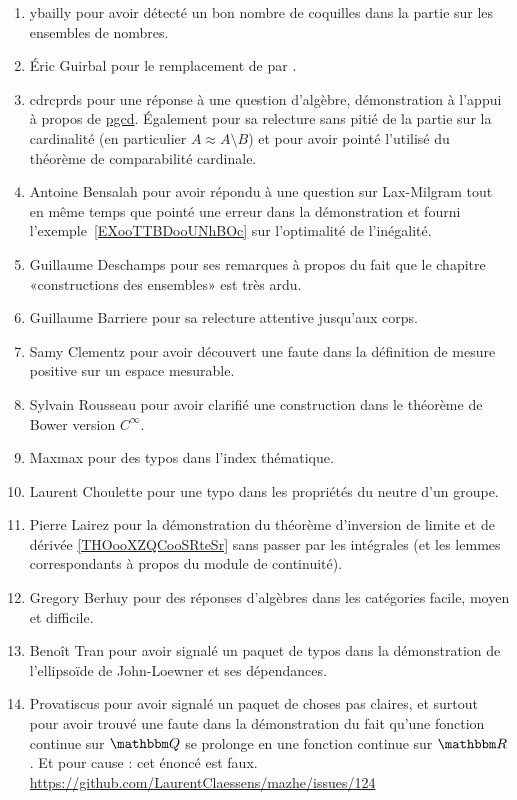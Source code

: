 \begin{enumerate}
    \item
        ybailly pour avoir détecté un bon nombre de coquilles dans la partie sur les ensembles de nombres.
    \item
        Éric Guirbal pour le remplacement de  par .
    \item
        cdrcprds pour une réponse à une question d'algèbre, démonstration à l'appui à propos de \href{https://github.com/LaurentClaessens/mazhe/issues/52#issuecomment-333251728}{pgcd}. Également pour sa relecture sans pitié de la partie sur la cardinalité (en particulier \( A\approx A\setminus B\)) et pour avoir pointé l'utilisé du théorème de comparabilité cardinale.
    \item
        Antoine Bensalah pour avoir répondu à une question sur Lax-Milgram tout en même temps que pointé une erreur dans la démonstration et fourni l'exemple~\ref{EXooTTBDooUNhBOc} sur l'optimalité de l'inégalité.
    \item
        Guillaume Deschamps pour ses remarques à propos du fait que le chapitre «constructions des ensembles» est très ardu.
    \item
        Guillaume Barriere pour sa relecture attentive jusqu'aux corps.
    \item
        Samy Clementz pour avoir découvert une faute dans la définition de mesure positive sur un espace mesurable.
    \item
        Sylvain Rousseau pour avoir clarifié une construction dans le théorème de Bower version \(  C^{\infty}\).
    \item
        Maxmax pour des typos dans l'index thématique.
    \item
        Laurent Choulette pour une typo dans les propriétés du neutre d'un groupe.
    \item
        Pierre Lairez pour la démonstration du théorème d'inversion de limite et de dérivée \ref{THOooXZQCooSRteSr} sans passer par les intégrales (et les lemmes correspondants à propos du module de continuité).
    \item
        Gregory Berhuy pour des réponses d'algèbres dans les catégories facile, moyen et difficile.
    \item
        Benoît Tran pour avoir signalé un paquet de typos dans la démonstration de l'ellipsoïde de John-Loewner et ses dépendances.
    \item
        Provatiscus pour avoir signalé un paquet de choses pas claires, et surtout pour avoir trouvé une faute dans la démonstration du fait qu'une fonction continue sur \( \eQ\) se prolonge en une fonction continue sur \( \eR\). Et pour cause : cet énoncé est faux. \url{https://github.com/LaurentClaessens/mazhe/issues/124}

\end{enumerate}
